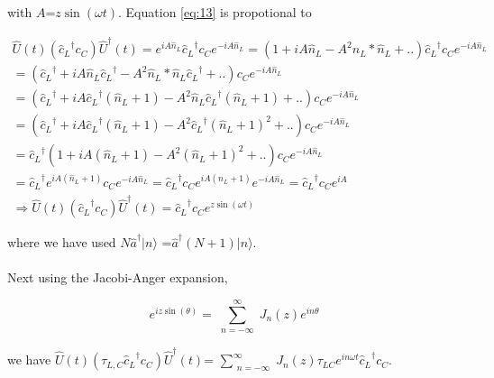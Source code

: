 with $A$=$z\sin(\omega t)$. Equation \ref{eq:13} is propotional to
\begin{center}
\begin{multline}  \label{eq:15}
\widehat{U}(t)(   {\widehat{c}_{L}}^{\dagger} c_{C} ){\widehat{U}}^{\dagger}(t) = e^{iA\widehat{n}_L} {\widehat{c}_{L}}^{\dagger} c_{C} e^{-iA\widehat{n}_L}
=(1+iA\widehat{n}_L -A^{2} \widehat{n}_L * \widehat{n}_L+..)   {\widehat{c}_{L}}^{\dagger} c_{C} e^{-iA \widehat{n}_L} 
\\
=   ({\widehat{c}_{L}}^{\dagger} +iA\widehat{n}_L {\widehat{c}_{L}}^{\dagger} -A^{2} \widehat{n}_L*\widehat{n}_L {\widehat{c}_{L}}^{\dagger}  +..)c_{C} e^{-iA\widehat{n}_L} 
\\
=   ({\widehat{c}_{L}}^{\dagger} +iA{\widehat{c}_{L}}^{\dagger}(\widehat{n}_L +1) - A^{2} \widehat{n}_L {\widehat{c}_{L}}^{\dagger} (\widehat{n}_L + 1)  +..) c_{C} e^{-iA\widehat{n}_L} 
\\
=   ({\widehat{c}_{L}}^{\dagger} +iA{\widehat{c}_{L}}^{\dagger}(\widehat{n}_L +1) - A^{2} {\widehat{c}_{L}}^{\dagger} (\widehat{n}_L + 1)^2  +..) c_{C} e^{-iA\widehat{n}_L}
\\
=   {\widehat{c}_{L}}^{\dagger} (1 +iA(\widehat{n}_L +1) - A^{2} (\widehat{n}_L + 1)^2  +..) c_{C} e^{-iA\widehat{n}_L}
\\
=  {\widehat{c}_{L}}^{\dagger}e^{iA(\widehat{n}_L+1)} c_{C}e^{-iA\widehat{n}_L}
=   {\widehat{c}_{L}}^{\dagger} c_{C} e^{iA(\widehat{n}_L+1)}  
e^{-iA\widehat{n}_L}=  {\widehat{c}_{L}}^{\dagger} c_{C} e^{iA} 
\\
\Rightarrow \widehat{U}(t)(   {\widehat{c}_{L}}^{\dagger} c_{C} ){\widehat{U}}^{\dagger}(t) =   {\widehat{c}_{L}}^{\dagger} c_{C} e^{ z\sin(\omega t)}
\end{multline}
\end{center}

where we have used $N{\widehat{a}}^{\dagger} \vert n \rangle $ =$ {\widehat{a}}^{\dagger}(N +1)\vert n \rangle $.\\
\\Next using the Jacobi-Anger expansion, 

\begin{equation} \label{eq:16}
e^{i z \sin(\theta)}= \sum_{\substack{n={-\infty}}}^\infty J_n ( z ) e^{i n \theta}
\end{equation}

we have $\widehat{U}(t)(\tau_{L,C}{\widehat{c}_{L}}^{\dagger} c_{C}){\widehat{U}}^{\dagger}(t)$= $\sum_{\substack{n={-\infty}}}^\infty J_n (z) \tau_{LC} e^{i n \omega t} {\widehat{c}_{L}}^{\dagger} c_{C} $. \\


